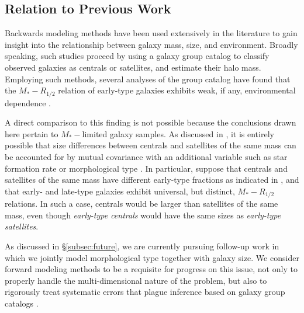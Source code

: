 \documentclass[usenatbib,usegraphicx,letterpaper]{mn2e}
\newcommand{\rhalf}{R_{1/2}}
\newcommand{\mstar}{M_{\ast}}
\begin{document}
\subsection{Relation to Previous Work}
\label{subsec:previous_work}

Backwards modeling methods have been used extensively in the literature to gain insight into the relationship between galaxy mass, size, and environment. Broadly speaking, such studies proceed by using a galaxy group catalog to classify observed galaxies as centrals or satellites, and estimate their halo mass.  Employing such methods, several analyses of the \citet{yang_etal05b} group catalog have found that the $\mstar-\rhalf$ relation of early-type galaxies exhibits weak, if any, environmental dependence \citep{huertas_company_etal13b,shankar_etal14}.

A direct comparison to this finding is not possible because the conclusions drawn here pertain to $\mstar-$limited galaxy samples. As discussed in \citet{spindler_wake17}, it is entirely possible that size differences between centrals and satellites of the same mass can be accounted for by mutual covariance with an additional variable such as star formation rate or morphological type \citep[see also][for an explicit demonstration of this scenario]{lilly_carollo16}. In particular, suppose that centrals and satellites of the same mass have different early-type fractions as indicated in \citet{weinmann_etal06}, and that early- and late-type galaxies exhibit universal, but distinct, $\mstar-\rhalf$ relations. In such a case, centrals would be larger than satellites of the same mass, even though {\em early-type centrals} would have the same sizes as {\em early-type satellites}.

As discussed in \S\ref{subsec:future}, we are currently pursuing follow-up work in which we jointly model morphological type together with galaxy size. We consider forward modeling methods to be a requisite for progress on this issue, not only to properly handle the multi-dimensional nature of the problem, but also to rigorously treat systematic errors that plague inference based on galaxy group catalogs \citep[see][for a thorough discussion]{campbell_etal15}.
\end{document}
